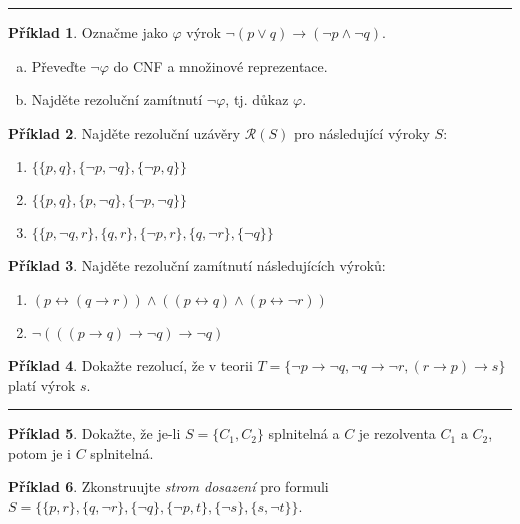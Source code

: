 \documentclass{amsart}
\theoremstyle{definition}
\newtheorem{problem}{Příklad}
\begin{document}
\hrule

\begin{problem}
Označme jako $\varphi$ výrok $\neg (p \vee q) \to (\neg p \wedge \neg q)$.
\begin{enumerate}[(a)]
\item Převeďte $\neg \varphi$ do CNF a množinové reprezentace.
\item Najděte rezoluční zamítnutí $\neg \varphi$, tj. důkaz $\varphi$.
\end{enumerate}
\end{problem}\medskip


\begin{problem}
Najděte rezoluční uzávěry $\mathcal{R}(S)$ pro následující výroky $S$:
\begin{enumerate}
\item $\{\{p,q\},\{\neg p, \neg q\},\{\neg p, q\}\}$
\item $\{\{p,q\},\{p,\neg q\},\{\neg p,\neg q\}\}$
\item $\{\{p,\neg q,r\},\{q,r\},\{\neg p, r\},\{q,\neg r\},\{\neg q\}\}$
\end{enumerate}
\end{problem}\medskip

\begin{problem}
Najděte rezoluční zamítnutí následujících výroků:
\begin{enumerate}
\item $(p\leftrightarrow (q\to r))\wedge((p\leftrightarrow q)\wedge(p\leftrightarrow \neg r))$
\item $\neg(((p\to q)\to \neg q)\to \neg q)$
\end{enumerate}
\end{problem}\medskip


\begin{problem}
Dokažte rezolucí, že v teorii $T=\{\neg p \to \neg q,\neg q \to \neg r, (r\to p)\to s\}$ platí výrok $s$.
\end{problem}\medskip

\hrule


\begin{problem}
Dokažte, že je-li $S=\{C_1,C_2\}$ splnitelná a $C$ je rezolventa $C_1$ a $C_2$, potom je i $C$ splnitelná.
\end{problem}\medskip

\begin{problem}
Zkonstruujte \emph{strom dosazení} pro formuli $S=\{\{p,r\},\{q,\neg r\},\{\neg q\},\{\neg p,t\},\{\neg s\},\{s,\neg t\}\}$.
\end{problem}\medskip
\end{document}
